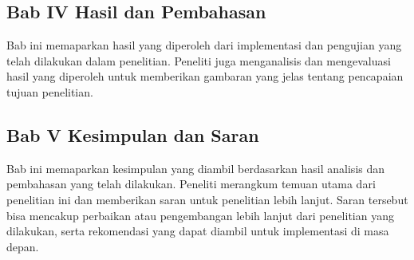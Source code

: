 \subsection{Bab IV Hasil dan Pembahasan}
Bab ini memaparkan hasil yang diperoleh dari implementasi dan pengujian yang telah dilakukan dalam penelitian. Peneliti juga menganalisis dan mengevaluasi hasil yang diperoleh untuk memberikan gambaran yang jelas tentang pencapaian tujuan penelitian.

\subsection{Bab V Kesimpulan dan Saran}
Bab ini memaparkan kesimpulan yang diambil berdasarkan hasil analisis dan pembahasan yang telah dilakukan. Peneliti merangkum temuan utama dari penelitian ini dan memberikan saran untuk penelitian lebih lanjut. Saran tersebut bisa mencakup perbaikan atau pengembangan lebih lanjut dari penelitian yang dilakukan, serta rekomendasi yang dapat diambil untuk implementasi di masa depan.


